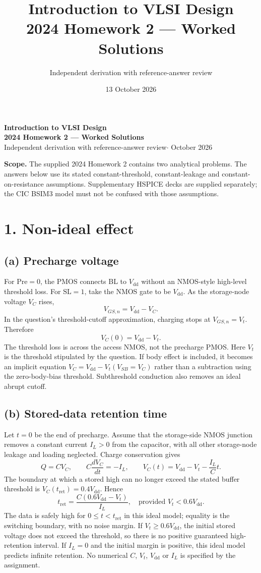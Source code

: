 \documentclass[11pt,a4paper]{article}
\title{Introduction to VLSI Design\\2024 Homework 2 --- Worked Solutions}
\author{Independent derivation with reference-answer review}
\date{13 October 2026}
\newcommand{\VDD}{V_{\mathrm{dd}}}
\newcommand{\VTH}{V_t}
\newcommand{\IL}{I_L}
\begin{document}
\begin{center}
{\Large\bfseries Introduction to VLSI Design\\[3pt]
2024 Homework 2 --- Worked Solutions}\\[6pt]
{\small Independent derivation with reference-answer review\quad$\cdot$ October 2026}
\end{center}
\textbf{Scope.} The supplied 2024 Homework 2 contains two analytical problems.
The answers below use its stated constant-threshold, constant-leakage and
constant-on-resistance assumptions. Supplementary HSPICE decks are supplied
separately; the CIC BSIM3 model must not be confused with those assumptions.

\section*{1. Non-ideal effect}
\subsection*{(a) Precharge voltage}
For $\mathrm{Pre}=0$, the PMOS connects BL to $\VDD$ without an NMOS-style
high-level threshold loss. For $\mathrm{SL}=1$, take the NMOS gate to be
$\VDD$. As the storage-node voltage $V_C$ rises,
\[
 V_{GS,n}=\VDD-V_C.
\]
In the question's threshold-cutoff approximation, charging stops at
$V_{GS,n}=\VTH$. Therefore
\begin{equation}
 \boxed{V_C(0)=\VDD-\VTH.}\label{eq:precharge}
\end{equation}
The threshold loss is across the access NMOS, not the precharge PMOS.
Here $\VTH$ is the threshold stipulated by the question. If body effect is
included, it becomes an implicit equation
$V_C=\VDD-V_t(V_{SB}=V_C)$ rather than a subtraction using the zero-body-bias
threshold. Subthreshold conduction also removes an ideal abrupt cutoff.

\subsection*{(b) Stored-data retention time}
Let $t=0$ be the end of precharge. Assume that the storage-side NMOS
junction removes a constant current $\IL>0$ from the capacitor, with all
other storage-node leakage and loading neglected. Charge conservation gives
\[
 Q=CV_C,\qquad C\frac{dV_C}{dt}=-\IL,
 \qquad V_C(t)=\VDD-\VTH-\frac{\IL}{C}t.
\]
The boundary at which a stored high can no longer exceed the stated
buffer threshold is $V_C(t_{\mathrm{ret}})=0.4\VDD$. Hence
\begin{equation}
 \boxed{t_{\mathrm{ret}}=\frac{C(0.6\VDD-\VTH)}{\IL},
 \quad\text{provided }\VTH<0.6\VDD.}\label{eq:retention}
\end{equation}
The data is safely high for $0\leq t<t_{\mathrm{ret}}$ in this ideal model;
equality is the switching boundary, with no noise margin. If
$\VTH\geq0.6\VDD$, the initial stored voltage does not exceed the threshold,
so there is no positive guaranteed high-retention interval. If $\IL=0$ and
the initial margin is positive, this ideal model predicts infinite retention.
No numerical $C$, $\VTH$, $\VDD$ or $\IL$ is specified by the assignment.
\end{document}
